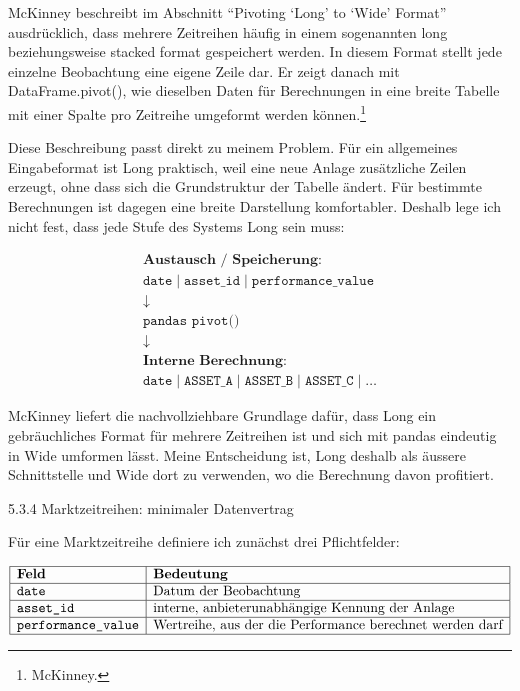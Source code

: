 \documentclass[
  ngerman,
  a4paper,
  DIV=11,
  oneside]{scrreprt}
\begin{document}
McKinney beschreibt im Abschnitt ``Pivoting `Long' to `Wide' Format''
ausdrücklich, dass mehrere Zeitreihen häufig in einem sogenannten long
beziehungsweise stacked format gespeichert werden. In diesem Format
stellt jede einzelne Beobachtung eine eigene Zeile dar. Er zeigt danach
mit DataFrame.pivot(), wie dieselben Daten für Berechnungen in eine
breite Tabelle mit einer Spalte pro Zeitreihe umgeformt werden
können.\footnote{McKinney.}

Diese Beschreibung passt direkt zu meinem Problem. Für ein allgemeines
Eingabeformat ist Long praktisch, weil eine neue Anlage zusätzliche
Zeilen erzeugt, ohne dass sich die Grundstruktur der Tabelle ändert. Für
bestimmte Berechnungen ist dagegen eine breite Darstellung komfortabler.
Deshalb lege ich nicht fest, dass jede Stufe des Systems Long sein muss:

\[
\begin{array}{c}
\mathbf{\text{Austausch / Speicherung:}}
\\[4pt]
\boxed{\texttt{date} \;|\; \texttt{asset\_id} \;|\; \texttt{performance\_value}}
\\[10pt]
\downarrow
\\[-2pt]
\texttt{pandas pivot()}
\\[10pt]
\downarrow
\\[-2pt]
\mathbf{\text{Interne Berechnung:}}
\\[4pt]
\boxed{\texttt{date} \;|\; \texttt{ASSET\_A} \;|\; \texttt{ASSET\_B} \;|\; \texttt{ASSET\_C} \;|\; \ldots}
\end{array}
\]

McKinney liefert die nachvollziehbare Grundlage dafür, dass Long ein
gebräuchliches Format für mehrere Zeitreihen ist und sich mit pandas
eindeutig in Wide umformen lässt. Meine Entscheidung ist, Long deshalb
als äussere Schnittstelle und Wide dort zu verwenden, wo die Berechnung
davon profitiert.

5.3.4 Marktzeitreihen: minimaler Datenvertrag

Für eine Marktzeitreihe definiere ich zunächst drei Pflichtfelder:

\[
\begin{array}{|l|l|}
\hline
\textbf{Feld} & \textbf{Bedeutung} \\
\hline
\texttt{date} & \text{Datum der Beobachtung} \\
\hline
\texttt{asset\_id} & \text{interne, anbieterunabhängige Kennung der Anlage} \\
\hline
\texttt{performance\_value} & \text{Wertreihe, aus der die Performance berechnet werden darf} \\
\hline
\end{array}
\]
\end{document}
